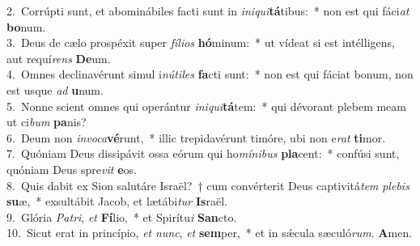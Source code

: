 {2.~}Corrúpti sunt, et abominábiles facti sunt in \textit{i}\textit{ni}\textit{qui}\textbf{tá}tibus:~* non est qui fáci\textit{at} \textbf{bo}num.\\
{3.~}Deus de cælo prospéxit super \textit{fí}\textit{li}\textit{os} \textbf{hó}minum:~* ut vídeat si est intélligens, aut requí\textit{rens} \textbf{De}um.\\
{4.~}Omnes declinavérunt simul i\textit{nú}\textit{ti}\textit{les} \textbf{fa}cti sunt:~* non est qui fáciat bonum, non est usque \textit{ad} \textbf{u}num.\\
{5.~}Nonne scient omnes qui operántur \textit{i}\textit{ni}\textit{qui}\textbf{tá}tem:~* qui dévorant plebem meam ut ci\textit{bum} \textbf{pa}nis?\\
{6.~}Deum non \textit{in}\textit{vo}\textit{ca}\textbf{vé}runt,~* illic trepidavérunt timóre, ubi non e\textit{rat} \textbf{ti}mor.\\
{7.~}Quóniam Deus dissipávit ossa eórum qui ho\textit{mí}\textit{ni}\textit{bus} \textbf{pla}cent:~* confúsi sunt, quóniam Deus spre\textit{vit} \textbf{e}os.\\
{8.~}Quis dabit ex Sion salutáre Israël?~† cum convérterit Deus captivitá\textit{tem} \textit{ple}\textit{bis} \textbf{su}æ,~* exsultábit Jacob, et lætábi\textit{tur} \textbf{Is}raël.\\
{9.~}Glória \textit{Pa}\textit{tri}, \textit{et} \textbf{Fí}lio,~* et Spirítu\textit{i} \textbf{San}cto.\\
{10.~}Sicut erat in princípio, \textit{et} \textit{nunc}, \textit{et} \textbf{sem}per,~* et in sǽcula sæculó\textit{rum}. \textbf{A}men.\\
